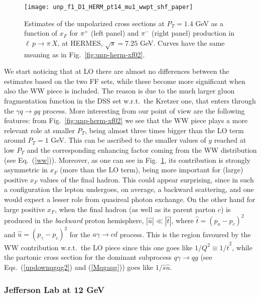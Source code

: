 \documentclass[nofootinbib,superscriptaddress,aps]{revtex4}
\begin{document}
\begin{figure}[ht!]
 \begin{center}
 \texttt{[image: unp\_f1\_D1\_HERM\_pt14\_mu1\_wwpt\_shf\_paper]}
\end{center}
 \caption{Estimates of the unpolarized cross sections at $P_T=1.4$ GeV as a function of $x_F$ for $\pi^+$ (left panel) and $\pi^-$ (right panel) production in $\ell\, p\to \pi\,X$, at HERMES, $\sqrt{s} = 7.25$ GeV. Curves have the same meaning as in Fig.~\ref{fig:unp-herm-xf02}.}
  \label{fig:unp-herm-pt14}
\end{figure}

We start noticing that at LO there are almost no differences between the estimates based on the two FF sets, while these become more significant when also the WW piece is included. The reason is due to the much larger gluon fragmentation function in the DSS set w.r.t.~the Kretzer one, that enters through the $\gamma q\to g q$ process. More interesting from our point of view are the following features: from Fig.~\ref{fig:unp-herm-xf02} we see that the WW piece plays a more relevant role at smaller $P_T$, being almost three times bigger than the LO term around $P_T=1$ GeV. This can be ascribed to the smaller values of $y$ reached at low $P_T$ and the corresponding enhancing factor coming from the WW distribution (see Eq.~(\ref{ww})). Moreover, as one can see in Fig.~\ref{fig:unp-herm-pt14}, its contribution is strongly asymmetric in $x_F$ (more than the LO term), being more important for (large) positive $x_F$ values of the final hadron. This could appear surprising, since in such a configuration the lepton undergoes, on average, a backward scattering, and one would expect a lesser role from quasireal photon exchange. On the other hand for large positive $x_F$, when the final hadron (as well as its parent parton $c$) is produced in the \emph{backward} proton hemisphere, $|\hat u| \ll |\hat t|$, where $\hat t = (p_a - p_c)^2$ and $\hat u = (p_\gamma-p_c)^2$ for the $a\gamma\to c d$ process. This is the region favoured by the WW contribution w.r.t.~the LO piece since this one goes like $1/Q^2 \equiv 1/\hat t^2$, while the partonic cross section for the dominant subprocess $q\gamma\to q g$ (see Eqs.~(\ref{updownqgqg2}) and (\ref{Mqgaqg})) goes like $1/\hat s\hat u$.

\subsubsection{Jefferson Lab at 12 GeV}
\end{document}
